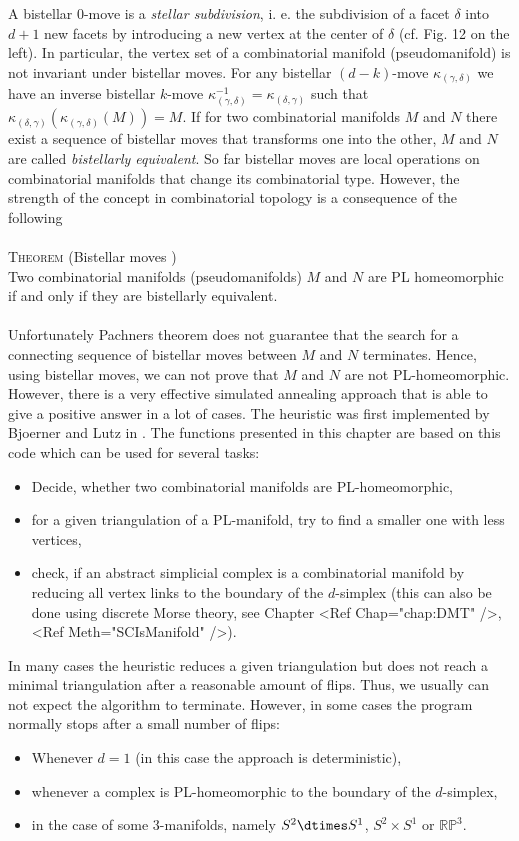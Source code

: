 \documentclass[a4paper,11pt]{report}
\begin{document}
{{ A bistellar $0$-move is a \emph{stellar subdivision}, i. e. the subdivision of a facet $\delta$ into $d+1$ new facets by introducing a new vertex at the center of $\delta$ (cf. Fig. 12 on the left). In particular, the vertex set of a combinatorial
manifold (pseudomanifold) is not invariant under bistellar moves. For any
bistellar $(d-k)$-move $\kappa_{(\gamma,\delta)}$ we have an inverse bistellar $k$-move $\kappa^{-1}_{(\gamma,\delta)} = \kappa_{(\delta,\gamma)}$ such that $\kappa_{(\delta,\gamma)} ( \kappa_{(\gamma,\delta)} (M)) = M$. If for two combinatorial manifolds $M$ and $N$ there exist a sequence of bistellar moves that transforms one into the other, $M$ and $N$ are called \emph{bistellarly equivalent}. So far bistellar moves are local operations on combinatorial manifolds that
change its combinatorial type. However, the strength of the concept in
combinatorial topology is a consequence of the following\\
\\
 \textsc{Theorem} (Bistellar moves \cite{Pachner87KonstrMethKombHomeo})\\
 Two combinatorial manifolds (pseudomanifolds) $M$ and $N$ are PL homeomorphic if and only if they are bistellarly equivalent.\\
\\
 Unfortunately Pachners theorem does not guarantee that the search for a
connecting sequence of bistellar moves between $M$ and $N$ terminates. Hence, using bistellar moves, we can not prove that $M$ and $N$ are not PL-homeomorphic. However, there is a very effective simulated
annealing approach that is able to give a positive answer in a lot of cases.
The heuristic was first implemented by Bjoerner and Lutz in \cite{Bjoerner00SimplMnfBistellarFlips}. The functions presented in this chapter are based on this code which can be
used for several tasks:  \begin{itemize} \item Decide, whether two combinatorial manifolds are
PL-homeomorphic, \item for a given triangulation of a PL-manifold, try to find
a smaller one with less vertices, \item check, if an abstract simplicial
complex is a combinatorial manifold by reducing all vertex links to the
boundary of the $d$-simplex (this can also be done using discrete Morse
theory, see Chapter <Ref Chap="chap:DMT" />, <Ref Meth="SCIsManifold" />).
\end{itemize} 

 In many cases the heuristic reduces a given triangulation but does not reach a
minimal triangulation after a reasonable amount of flips. Thus, we usually can
not expect the algorithm to terminate. However, in some cases the program
normally stops after a small number of flips:  \begin{itemize} \item Whenever $d=1$ (in this case the approach is
deterministic), \item whenever a complex is PL-homeomorphic to the boundary of
the $d$-simplex, \item in the case of some $3$-manifolds, namely $S^2 \dtimes
S^1$, $S^2 \times S^1$ or $\mathbb{RP}^3$. \end{itemize} 

}}
\end{document}
